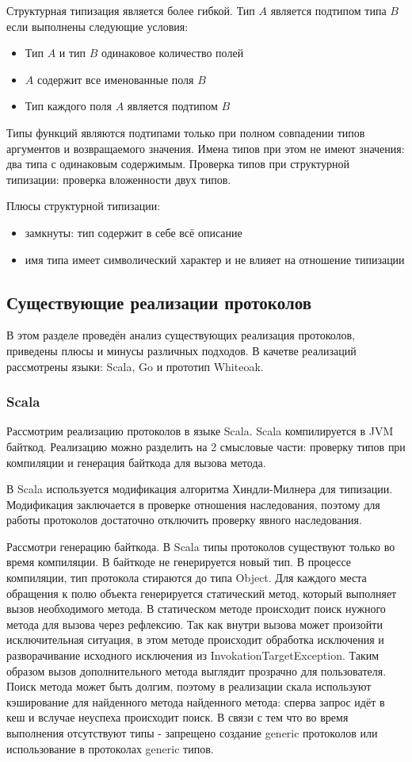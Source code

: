 \documentclass{spbau-diploma}
\begin{document}
Структурная типизация является более гибкой. Тип $A$ является подтипом типа $B$ если выполнены следующие условия:
\begin{itemize}
    \item Тип $A$ и тип $B$ одинаковое количество полей
    \item $A$ содержит все именованные поля $B$
    \item Тип каждого поля $A$ является подтипом $B$
\end{itemize}
Типы функций являются подтипами только при полном совпадении типов аргументов и возвращаемого значения. Имена типов при этом не имеют значения: два типа с одинаковым содержимым. Проверка типов при структурной типизации: проверка вложенности двух типов.

Плюсы структурной типизации:
\begin{itemize}
    \item замкнуты: тип содержит в себе всё описание
    \item имя типа имеет символический характер и не влияет на отношение типизации
\end{itemize}

\subsection{Существующие реализации протоколов}
В этом разделе проведён анализ существующих реализация протоколов, приведены плюсы и минусы различных подходов. В качетве реализаций рассмотрены языки: Scala, Go и прототип Whiteoak.

\subsubsection{Scala}
Рассмотрим реализацию протоколов в языке Scala. Scala компилируется в JVM байткод. Реализацию можно разделить на 2 смысловые части: проверку типов при компиляции и генерация байткода для вызова метода.

В Scala используется модификация алгоритма Хиндли-Милнера для типизации. Модификация заключается в проверке отношения наследования, поэтому для работы протоколов достаточно отключить проверку явного наследования.

Рассмотри генерацию байткода. В Scala типы протоколов существуют только во время компиляции. В байткоде не генерируется новый тип. В процессе компиляции, тип протокола стираются до типа Object. Для каждого места обращения к полю объекта генерируется статический метод, который выполняет вызов необходимого метода. В статическом методе происходит поиск нужного метода для вызова через рефлексию. Так как внутри вызова может произойти исключительная ситуация, в этом методе происходит обработка исключения и разворачивание исходного исключения из InvokationTargetException. Таким образом вызов дополнительного метода выглядит прозрачно для пользователя. Поиск метода может быть долгим, поэтому в реализации скала используют кэширование для найденного метода найденного метода: сперва запрос идёт в кеш и вслучае неуспеха происходит поиск. В связи с тем что во время выполнения отсутствуют типы - запрещено создание generic протоколов или использование в протоколах generic типов.
\end{document}

